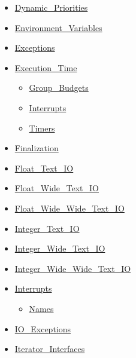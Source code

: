 \documentclass[english]{article}
\begin{document}
\begin{scriptsize}
\begin{multicols*}{5}
\begin{itemize}[leftmargin=0mm]
\begin{itemize}[leftmargin=5mm]
\begin{itemize}[leftmargin=5mm]
	\end{itemize}
  \item[] \href{http://www.ada-auth.org/standards/22rm/html/RM-D-5-1.html}{Dynamic\_Priorities}
  \item[] \href{http://www.ada-auth.org/standards/22rm/html/RM-A-17.html}{Environment\_Variables}
  \item[] \href{http://www.ada-auth.org/standards/22rm/html/RM-11-4-1.html}{Exceptions}
  \item[] \href{http://www.ada-auth.org/standards/22rm/html/RM-D-14.html}{Execution\_Time}
	\begin{itemize}[leftmargin=5mm]
	\item[] \href{http://www.ada-auth.org/standards/22rm/html/RM-D-14-2.html}{Group\_Budgets}
	\item[] \href{http://www.ada-auth.org/standards/22rm/html/RM-D-14-3.html}{Interrupts}
	\item[] \href{http://www.ada-auth.org/standards/22rm/html/RM-D-14-1.html}{Timers}
	\end{itemize}
  \item[] \href{http://www.ada-auth.org/standards/22rm/html/RM-7-6.html}{Finalization}
  \item[] \href{http://www.ada-auth.org/standards/22rm/html/RM-A-10-9.html}{Float\_Text\_IO}
  \item[] \href{http://www.ada-auth.org/standards/22rm/html/RM-A-11.html}{Float\_Wide\_Text\_IO}
  \item[] \href{http://www.ada-auth.org/standards/22rm/html/RM-A-11.html}{Float\_Wide\_Wide\_Text\_IO}
  \item[] \href{http://www.ada-auth.org/standards/22rm/html/RM-A-10-8.html}{Integer\_Text\_IO}
  \item[] \href{http://www.ada-auth.org/standards/22rm/html/RM-A-11.html}{Integer\_Wide\_Text\_IO}
  \item[] \href{http://www.ada-auth.org/standards/22rm/html/RM-A-11.html}{Integer\_Wide\_Wide\_Text\_IO}
  \item[] \href{http://www.ada-auth.org/standards/22rm/html/RM-C-3-2.html}{Interrupts}
	\begin{itemize}[leftmargin=5mm]
	\item[] \href{http://www.ada-auth.org/standards/22rm/html/RM-C-3-2.html}{Names}
	\end{itemize}
  \item[] \href{http://www.ada-auth.org/standards/22rm/html/RM-A-13.html}{IO\_Exceptions}
  \item[] \href{http://www.ada-auth.org/standards/22rm/html/RM-5-5-1.html}{Iterator\_Interfaces}

\end{itemize}
\end{itemize}
\end{multicols*}
\end{scriptsize}
\end{document}
